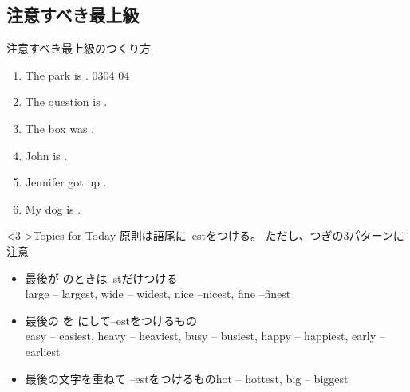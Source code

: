 \documentclass[aspectratio=169,xcolor={dvipsnames,table}]{beamer}
\begin{document}
\subsection{注意すべき最上級}
\begin{frame}[plain]{注意すべき最上級のつくり方}
 \begin{enumerate}
  \item<1-> The park is  .%
\hfill{\tiny 0304}\,{\scriptsize {}\,04}
  \item<1-> The question is  .
  \item<1-> The box was  .
  \item<1-> John is  .
  \item<1-> Jennifer got up  .
  \item<1-> My dog is  .
 \end{enumerate}

\begin{block}<3->{Topics for Today}
{\small 原則は語尾に--estをつける。
ただし、つぎの3パターンに注意}
\begin{itemize}[square]\small
 \item<3-> 最後が\,\,のときは--stだけつける\\\hfill{}large -- largest, wide -- widest, nice --nicest, fine --finest　
 \item<8-> 最後の\,\,を\,\,にして--estをつけるもの\\\hfill{}easy -- easiest, heavy -- heaviest, busy -- busiest, happy -- happiest, early -- earliest　
 \item<10-> 最後の文字を重ねて --estをつけるもの\hfill{}hot -- hottest, big -- biggest　

 \end{itemize}
     \end{block}
\end{frame}
\end{document}

